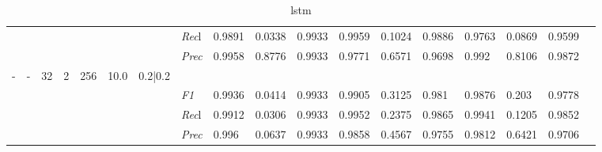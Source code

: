 \begin{table}[]
\begin{tabularx}{\textwidth}{XXXXXXX|X|XXX|XXX|XXXX}
    & & & & & & & \textit{Rec}l & 0.9891 & 0.0338 & 0.9933    & 0.9959 & 0.1024    & 0.9886    & 0.9763    & 0.0869    & 0.9599    \\
    & & & & & & & \textit{Prec} & 0.9958 & 0.8776 & 0.9933 & 0.9771 & 0.6571 & 0.9698 & 0.992 & 0.8106 & 0.9872 \\ \midrule
    - & - & 32 & 2 & 256 &10.0 & 0.2|0.2 & & & & & & & & & \\
    & & & & & & & \textit{F1} & 0.9936 & 0.0414 & 0.9933 & 0.9905 & 0.3125        & 0.981        & 0.9876        & 0.203        & 0.9778        \\
    & & & & & & & \textit{Rec}l & 0.9912 & 0.0306 & 0.9933    & 0.9952 & 0.2375    & 0.9865    & 0.9941    & 0.1205    & 0.9852    \\
    & & & & & & & \textit{Prec} & 0.996 & 0.0637 & 0.9933 & 0.9858 & 0.4567 & 0.9755 & 0.9812 & 0.6421 & 0.9706 \\ \midrule
    \end{tabularx}
    \caption{lstm}
    \label{tab:all_results_lstm}
    \end{table}